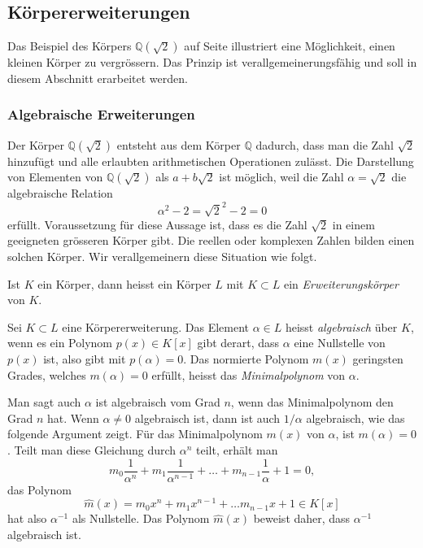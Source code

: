 %
%
%
\subsection{Körpererweiterungen
\label{buch:integral:subsection:koerpererweiterungen}}
Das Beispiel des Körpers $\mathbb{Q}(\!\sqrt{2})$ auf Seite
\pageref{buch:integral:beispiel:Qsqrt2} illustriert eine Möglichkeit,
einen kleinen Körper zu vergrössern.
Das Prinzip ist verallgemeinerungsfähig und soll in diesem Abschnitt
erarbeitet werden.

%
\subsubsection{Algebraische Erweiterungen}
Der Körper $\mathbb{Q}(\!\sqrt{2})$ entsteht aus dem Körper $\mathbb{Q}$
dadurch, dass man die Zahl $\sqrt{2}$ hinzufügt und alle erlaubten
arithmetischen Operationen zulässt.
Die Darstellung von Elementen von $\mathbb{Q}(\!\sqrt{2})$ als
$a+b\sqrt{2}$ ist möglich, weil die Zahl $\alpha=\sqrt{2}$ die 
algebraische Relation
\[
\alpha^2-2 = \sqrt{2}^2 -2 = 0
\]
erfüllt.
Voraussetzung für diese Aussage ist, dass es die Zahl $\sqrt{2}$ in einem
geeigneten grösseren Körper gibt. 
Die reellen oder komplexen Zahlen bilden einen solchen Körper.
Wir verallgemeinern diese Situation wie folgt.

\begin{definition}
Ist $K$ ein Körper, dann heisst ein Körper $L$ mit $K\subset L$ ein
{\em Erweiterungskörper} von $K$.
\end{definition}

\begin{definition}
\label{buch:integral:definition:algebraisch}
Sei $K\subset L$ eine Körpererweiterung.
Das Element $\alpha\in L$ heisst {\em algebraisch} über $K$, wenn es
ein Polynom $p(x)\in K[x]$ gibt derart, dass $\alpha$ eine Nullstelle
von $p(x)$ ist, also gibt mit $p(\alpha)=0$.
Das normierte Polynom $m(x)$ geringsten Grades, welches $m(\alpha)=0$
erfüllt, heisst das {\em Minimalpolynom} von $\alpha$.
%
\end{definition}

Man sagt auch $\alpha$ ist algebraisch vom Grad $n$, wenn das Minimalpolynom
den Grad $n$ hat.
Wenn $\alpha\ne 0$ algebraisch ist, dann ist auch $1/\alpha$ algebraisch,
wie das folgende Argument zeigt.
Für das Minimalpolynom $m(x)$ von $\alpha$, ist $m(\alpha)=0$.
Teilt man diese Gleichung durch $\alpha^n$ teilt, erhält man 
\[
m_0\frac{1}{\alpha^n}
+
m_1\frac{1}{\alpha^{n-1}}
+
\ldots
+
m_{n-1}\frac{1}{\alpha}
+
1
=
0,
\]
das Polynom
\[
\hat{m}(x)
=
m_0x^n + m_1x^{n-1} + \ldots m_{n-1} x + 1
\in
K[x]
\]
hat also $\alpha^{-1}$ als Nullstelle.
Das Polynom $\hat{m}(x)$ beweist daher, dass $\alpha^{-1}$ algebraisch ist.

